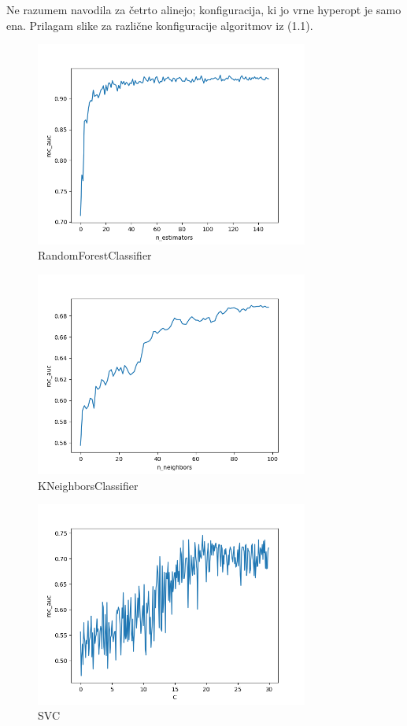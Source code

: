 \documentclass{article}
\begin{document}
Ne razumem navodila za četrto alinejo; konfiguracija, ki jo vrne hyperopt je samo ena. Prilagam slike za različne konfiguracije algoritmov iz (1.1).
\begin{figure}[h!]
    \caption{RandomForestClassifier}
    \centering
    \includegraphics[width=0.8\textwidth]{rfc}
\end{figure}
\begin{figure}[h!]
    \caption{KNeighborsClassifier}
    \centering
    \includegraphics[width=0.8\textwidth]{knn}
\end{figure}
\begin{figure}[h!]
    \caption{SVC}
    \centering
    \includegraphics[width=0.8\textwidth]{svc}
\end{figure}
\end{document}
